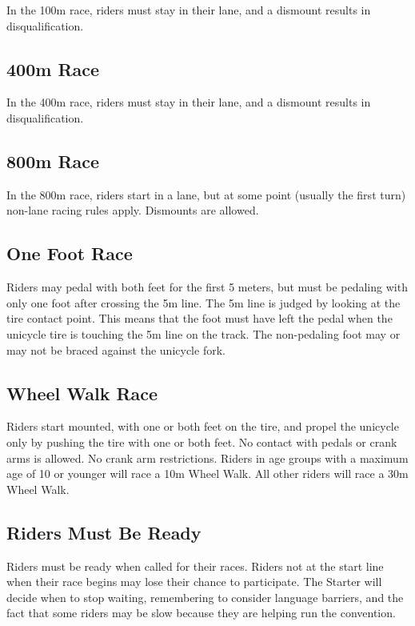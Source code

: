 In the 100m race, riders must stay in their lane, and a dismount results in disqualification.

\subsection{400m Race}

In the 400m race, riders must stay in their lane, and a dismount results in disqualification.

\subsection{800m Race}

In the 800m race, riders start in a lane, but at some point (usually the first turn) non-lane racing rules apply.
Dismounts are allowed.

\subsection{One Foot Race}
Riders may pedal with both feet for the first 5 meters, but must be pedaling with only one foot after crossing the 5m line.
The 5m line is judged by looking at the tire contact point.
This means that the foot must have left the pedal when the unicycle tire is touching the 5m line on the track.
The non-pedaling foot may or may not be braced against the unicycle fork.

\subsection{Wheel Walk Race}

Riders start mounted, with one or both feet on the tire, and propel the unicycle only by pushing the tire with one or both feet.
No contact with pedals or crank arms is allowed.
No crank arm restrictions.
Riders in age groups with a maximum age of 10 or younger will race a 10m Wheel Walk.
All other riders will race a 30m Wheel Walk.

\subsection{Riders Must Be Ready}

Riders must be ready when called for their races.
Riders not at the start line when their race begins may lose their chance to participate.
The Starter will decide when to stop waiting, remembering to consider language barriers, and the fact that some riders may be slow because they are helping run the convention.

